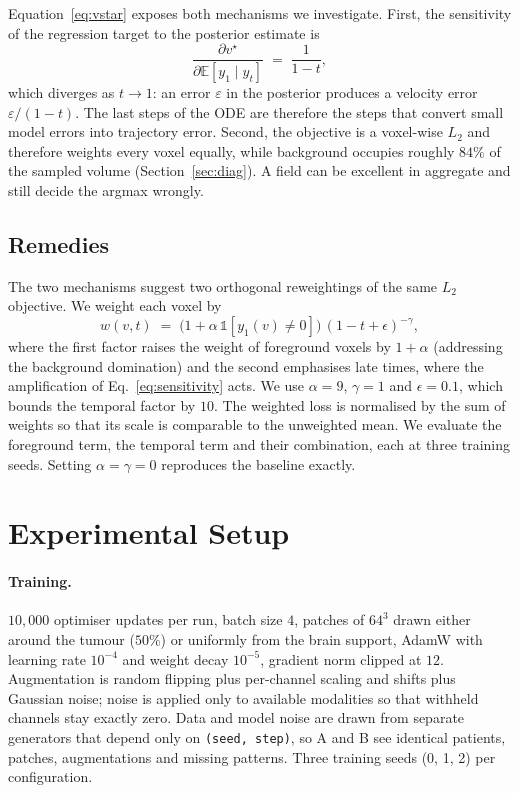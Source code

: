 \documentclass[conference]{IEEEtran}
\begin{document}
Equation~\eqref{eq:vstar} exposes both mechanisms we investigate. First, the
sensitivity of the regression target to the posterior estimate is
\begin{equation}
\frac{\partial v^\star}{\partial \mathbb{E}[y_1 \mid y_t]}
\;=\; \frac{1}{1-t},
\label{eq:sensitivity}
\end{equation}
which diverges as $t \to 1$: an error $\varepsilon$ in the posterior produces a
velocity error $\varepsilon/(1-t)$. The last steps of the ODE are therefore the
steps that convert small model errors into trajectory error. Second, the
objective is a voxel-wise $L_2$ and therefore weights every voxel equally, while
background occupies roughly $84\%$ of the sampled volume
(Section~\ref{sec:diag}). A field can be excellent in aggregate and still decide
the argmax wrongly.

\subsection{Remedies}
\label{sec:remedy}

The two mechanisms suggest two orthogonal reweightings of the same $L_2$
objective. We weight each voxel by
\begin{equation}
w(v, t) \;=\; \bigl(1 + \alpha\,\mathbb{1}[y_1(v) \neq 0]\bigr)\,
(1 - t + \epsilon)^{-\gamma},
\end{equation}
where the first factor raises the weight of foreground voxels by $1+\alpha$
(addressing the background domination) and the second emphasises late times,
where the amplification of Eq.~\eqref{eq:sensitivity} acts. We use $\alpha = 9$, $\gamma = 1$ and
$\epsilon = 0.1$, which bounds the temporal factor by $10$. The weighted loss is
normalised by the sum of weights so that its scale is comparable to the
unweighted mean. We evaluate the foreground term, the temporal term and their
combination, each at three training seeds. Setting $\alpha = \gamma = 0$
reproduces the baseline exactly.

\section{Experimental Setup}

\paragraph{Training.}
$10{,}000$ optimiser updates per run, batch size $4$, patches of
$64^3$ drawn either around the tumour ($50\%$) or uniformly from the brain
support, AdamW with learning rate $10^{-4}$ and weight decay $10^{-5}$, gradient
norm clipped at $12$. Augmentation is random flipping plus per-channel scaling
and shifts plus Gaussian noise; noise is applied only to available modalities so
that withheld channels stay exactly zero. Data and model noise are drawn from
separate generators that depend only on \texttt{(seed, step)}, so A and B see
identical patients, patches, augmentations and missing patterns. Three training
seeds (0, 1, 2) per configuration.
\end{document}

